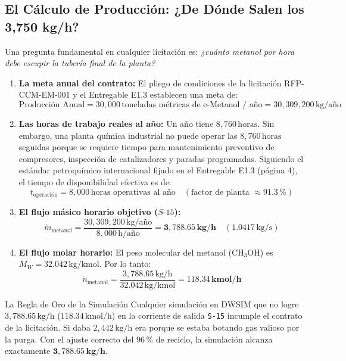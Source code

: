 \documentclass[11pt,a4paper]{article}
\begin{document}
\subsection{El Cálculo de Producción: ¿De Dónde Salen los 3,750 kg/h?}
Una pregunta fundamental en cualquier licitación es: \textit{¿cuánto metanol por hora debe escupir la tubería final de la planta?}
\begin{enumerate}
    \item \textbf{La meta anual del contrato:} El pliego de condiciones de la licitación RFP-CCM-EM-001 y el Entregable E1.3 establecen una meta de:
    \begin{equation}
        \text{Producción Anual} = 30{,}000\,\text{toneladas métricas de e-Metanol / año} = 30{,}309{,}200\,\text{kg/año}
    \end{equation}
    \item \textbf{Las horas de trabajo reales al año:} Un año tiene $8{,}760\,\text{horas}$. Sin embargo, una planta química industrial no puede operar las $8{,}760\,\text{horas}$ seguidas porque se requiere tiempo para mantenimiento preventivo de compresores, inspección de catalizadores y paradas programadas. Siguiendo el estándar petroquímico internacional fijado en el Entregable E1.3 (página 4), el tiempo de disponibilidad efectiva es de:
    \begin{equation}
        t_{\text{operación}} = 8{,}000\,\text{horas operativas al año} \quad (\text{factor de planta } \approx 91.3\,\%)
    \end{equation}
    \item \textbf{El flujo másico horario objetivo ($S\text{-}15$):}
    \begin{equation}
        \dot{m}_{\text{metanol}} = \frac{30{,}309{,}200\,\text{kg/año}}{8{,}000\,\text{h/año}} = \mathbf{3{,}788.65\,\text{kg/h}} \quad (1.0417\,\text{kg/s})
    \end{equation}
    \item \textbf{El flujo molar horario:} El peso molecular del metanol ($\text{CH}_3\text{OH}$) es $M_W = 32.042\,\text{kg/kmol}$. Por lo tanto:
    \begin{equation}
        \dot{n}_{\text{metanol}} = \frac{3{,}788.65\,\text{kg/h}}{32.042\,\text{kg/kmol}} = \mathbf{118.34\,\text{kmol/h}}
    \end{equation}
\end{enumerate}

\begin{conclusionbox}{La Regla de Oro de la Simulación}
Cualquier simulación en DWSIM que no logre $3{,}788.65\,\text{kg/h}$ ($118.34\,\text{kmol/h}$) en la corriente de salida \texttt{S-15} incumple el contrato de la licitación. Si daba $2{,}442\,\text{kg/h}$ era porque se estaba botando gas valioso por la purga. Con el ajuste correcto del $96\,\%$ de reciclo, la simulación alcanza exactamente $\mathbf{3{,}788.65\,\text{kg/h}}$.
\end{conclusionbox}
\end{document}
